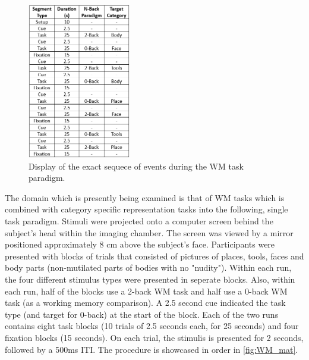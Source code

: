 \vspace{3cm}

\begin{figure}
    \centering
    \includegraphics[width = 0.4\textwidth]{assets/images/WM_mat.png}
    \caption{Display of the exact sequece of events during the \gls{WM} task paradigm.}
    \label{fig:WM_mat}
\end{figure}

The domain which is presently being examined is that of \gls{WM} tasks which is combined with category specific representation tasks into the following, single task paradigm. Stimuli were projected onto a computer screen behind the subject's head within the imaging chamber. The screen was viewed by a mirror positioned approximately 8 cm above the subject's face. Participants were presented with blocks of trials that consisted of pictures of places, tools, faces and body parts (non-mutilated parts of bodies with no "nudity"). Within each run, the four different stimulus types were presented in seperate blocks. Also, within each run, half of the blocks use a 2-back \gls{WM} task and half use a 0-back \gls{WM} task (as a working memory comparison). A 2.5 second cue indicated the task type (and target for 0-back) at the start of the block. Each of the two runs contains eight task blocks (10 trials of 2.5 seconds each, for 25 seconds) and four fixation blocks (15 seconds). On each trial, the stimulis is presented for 2 seconds, followed by a 500ms \gls{ITI}. The procedure is showcased in order in \autoref{fig:WM_mat}.














